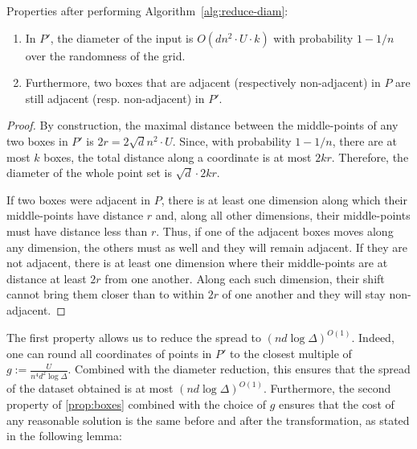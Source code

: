 \begin{proposition}\label{prop:boxes}

    Properties after performing Algorithm~\ref{alg:reduce-diam}:
    \begin{enumerate}
        \item In $P'$, the diameter of the input is $O(d n^2\cdot U \cdot k)$ with probability $1-1/n$ over the randomness of the grid.
        \item Furthermore, two boxes that are adjacent (respectively non-adjacent) in $P$ are still adjacent (resp. non-adjacent) in $P'$.
    \end{enumerate}

\end{proposition}
\begin{proof}

By construction, the maximal distance between the middle-points of any two boxes in $P'$ is $2r = 2\sqrt d n^2\cdot U$. Since, with probability $1-1/n$, there are at
most $k$ boxes, the total distance along a coordinate is at most $2kr$. Therefore, the diameter of the whole point set is $\sqrt{d} \cdot 2kr$.

If two boxes were adjacent in $P$, there is at least one dimension along which their middle-points have distance $r$ and, along all other dimensions, their
middle-points must have distance less than $r$. Thus, if one of the adjacent boxes moves along any dimension, the others must as well and they will remain
adjacent.
If they are not adjacent, there is at least one dimension where their middle-points are at distance at least $2r$ from one another. Along each such dimension,
their shift cannot bring them closer than to within $2r$ of one another and they will stay non-adjacent.

\end{proof}

The first property allows us to reduce the spread to $(nd \log \Delta)^{O(1)}$.  Indeed, one can round all coordinates of points in $P'$ to the closest multiple
of $g := \frac{U}{n^4 d^{2} \log \Delta}$.  Combined with the diameter reduction, this ensures that the spread of the dataset obtained is at most $(nd \log
\Delta)^{O(1)}$.  Furthermore, the second property of \cref{prop:boxes} combined with the choice of $g$ ensures that the cost of any reasonable solution is the
same before and after the transformation, as stated in the following lemma:

